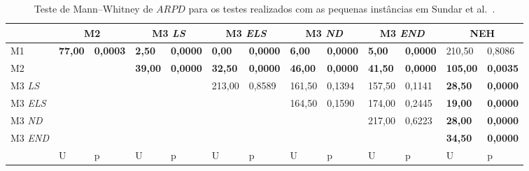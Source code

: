 \begin{table}[H]
\caption{Teste de Mann–Whitney de $ARPD$ para os testes realizados com as pequenas instâncias em Sundar et al.~\cite{sundarHybridArtificialBee2017}.}
\label{tab:P2_hipothesis_ARPD}
\setlength{\tabcolsep}{3pt} %
\begin{tabular}{l|ll|ll|ll|ll|ll|ll}
                                 & \multicolumn{2}{c|}{M2}          & \multicolumn{2}{c|}{M3 \textit{LS}} & \multicolumn{2}{c|}{M3 \textit{ELS}} & \multicolumn{2}{c|}{M3 \textit{ND}} & \multicolumn{2}{c|}{M3 \textit{END}} & \multicolumn{2}{c}{NEH}           \\ \hline
M1                               & \textbf{77,00} & \textbf{0,0003} & \textbf{2,50}            & \textbf{0,0000}           & \textbf{0,00}             & \textbf{0,0000}           & \textbf{6,00}            & \textbf{0,0000}           & \textbf{5,00}             & \textbf{0,0000}           & 210,50          & 0,8086          \\
M2                               & \textbf{}      & \textbf{}       & \textbf{39,00}           & \textbf{0,0000}           & \textbf{32,50}            & \textbf{0,0000}           & \textbf{46,00}           & \textbf{0,0000}           & \textbf{41,50}            & \textbf{0,0000}           & \textbf{105,00} & \textbf{0,0035} \\
M3 \textit{LS}  & \textbf{}      & \textbf{}       & \textbf{}                & \textbf{}                 & 213,00                    & 0,8589                    & 161,50                   & 0,1394                    & 157,50                    & 0,1141                    & \textbf{28,50}  & \textbf{0,0000} \\
M3 \textit{ELS} & \textbf{}      & \textbf{}       & \textbf{}                & \textbf{}                 & \textbf{}                 & \textbf{}                 & 164,50                   & 0,1590                    & 174,00                    & 0,2445                    & \textbf{19,00}  & \textbf{0,0000} \\
M3 \textit{ND}  & \textbf{}      & \textbf{}       & \textbf{}                & \textbf{}                 & \textbf{}                 & \textbf{}                 & \textbf{}                & \textbf{}                 & 217,00                    & 0,6223                    & \textbf{28,00}  & \textbf{0,0000} \\
M3 \textit{END} & \textbf{}      & \textbf{}       & \textbf{}                & \textbf{}                 & \textbf{}                 & \textbf{}                 & \textbf{}                & \textbf{}                 & \textbf{}                 & \textbf{}                 & \textbf{34,50}  & \textbf{0,0000} \\ \hline
                                 & U              & p               & U                        & p                         & U                         & p                         & U                        & p                         & U                         & p                         & U               & p              
\end{tabular}
\end{table}

